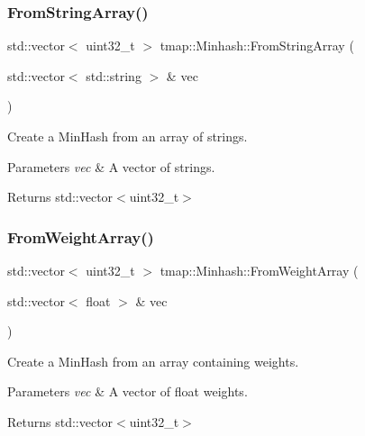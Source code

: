 \subsubsection{\texorpdfstring{From\+String\+Array()}{FromStringArray()}}
{\footnotesize\ttfamily std\+::vector$<$ uint32\+\_\+t $>$ tmap\+::\+Minhash\+::\+From\+String\+Array (\begin{DoxyParamCaption}\item[{std\+::vector$<$ std\+::string $>$ \&}]{vec }\end{DoxyParamCaption})}



Create a Min\+Hash from an array of strings. 


\begin{DoxyParams}{Parameters}
{\em vec} & A vector of strings. \\
\hline
\end{DoxyParams}
\begin{DoxyReturn}{Returns}
std\+::vector$<$uint32\+\_\+t$>$ 
\end{DoxyReturn}
\mbox{\label{classtmap_1_1Minhash_ac77f5302d479a2bc2c23a2304a9cf049}} 
\subsubsection{\texorpdfstring{From\+Weight\+Array()}{FromWeightArray()}}
{\footnotesize\ttfamily std\+::vector$<$ uint32\+\_\+t $>$ tmap\+::\+Minhash\+::\+From\+Weight\+Array (\begin{DoxyParamCaption}\item[{std\+::vector$<$ float $>$ \&}]{vec }\end{DoxyParamCaption})}



Create a Min\+Hash from an array containing weights. 


\begin{DoxyParams}{Parameters}
{\em vec} & A vector of float weights. \\
\hline
\end{DoxyParams}
\begin{DoxyReturn}{Returns}
std\+::vector$<$uint32\+\_\+t$>$ 
\end{DoxyReturn}
\mbox{\label{classtmap_1_1Minhash_a21df254dd86462a1dcbe45285c747e71}} 
